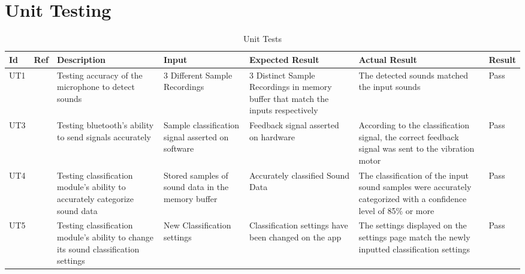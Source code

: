 \documentclass[12pt, titlepage]{article}
\begin{document}
\section{Unit Testing}
\begin{longtable}{|p{1.4cm}|p{1cm}|p{3cm}|p{1.5cm}|p{2.5cm}|p{2cm}|p{1.2cm}|}
  \caption{Unit Tests}
  \label{unitTests}
  \endfirsthead
  \endhead
  \hline
  \textbf{Id} & \textbf{Ref} & \textbf{Description}                                                         & \textbf{Input}                                    & \textbf{Expected Result}                                    & \textbf{Actual Result} & \textbf{Result}                                    \\ \hline
  UT1       &      & Testing accuracy of the microphone to detect sounds                                      & 3 Different Sample Recordings                             & 3 Distinct Sample Recordings in memory buffer that match the inputs respectively                    &     The detected sounds matched the input sounds                    & {\color[HTML]{32CB00} Pass} \\ \hline
  UT3       &      & Testing bluetooth's ability to send signals accurately                                                  & Sample classification signal asserted on software                 & Feedback signal asserted on hardware                        &         According to the classification signal, the correct feedback signal was sent to the vibration motor               & {\color[HTML]{32CB00} Pass} \\ \hline
  UT4       &      & Testing classification module's ability to accurately categorize sound data  & Stored samples of sound data in the memory buffer              & Accurately classified Sound Data                          &         The classification of the input sound samples were accurately categorized with a confidence level of 85\% or more               &                   {\color[HTML]{32CB00} Pass}                                 \\ \hline
  UT5       &      & Testing classification module's ability to change its sound classification settings                                      & New Classification settings                                  & Classification settings have been changed on the app                    &       The settings displayed on the settings page match the newly inputted classification settings                 &       {\color[HTML]{32CB00} Pass}                                             \\ \hline

\end{longtable}
\end{document}
